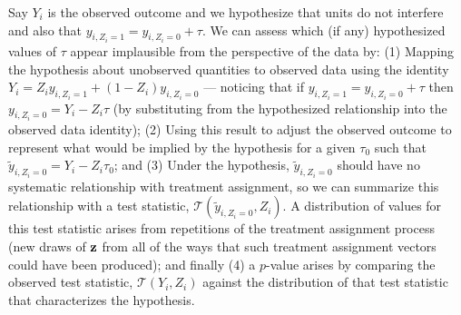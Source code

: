 Say $Y_i$ is the observed outcome and we hypothesize that units do not
interfere and also that $y_{i,Z_i=1}=y_{i,Z_i=0}+\tau$. We can assess which
(if any) hypothesized values of $\tau$ appear implausible from the perspective
of the data by: (1) Mapping the hypothesis about unobserved quantities to
observed data using the identity $Y_i=Z_i y_{i,Z_i=1} + (1-Z_i) y_{i,Z_i=0}$
--- noticing that if $y_{i,Z_i=1}=y_{i,Z_i=0}+\tau$ then $y_{i,Z_i=0}=Y_i -
Z_i \tau$ (by substituting from the hypothesized relationship into the
observed data identity); (2) Using this result to adjust the observed outcome
to represent what would be implied by the hypothesis for a given $\tau_0$ such
that $\widetilde y_{i,Z_i=0}=Y_i - Z_i \tau_0$; and (3) Under the hypothesis,
$\widetilde y_{i,Z_i=0}$ should have no systematic relationship with treatment
assignment, so we can summarize this relationship with a test statistic,
$\mathcal T(\widetilde y_{i,Z_i=0},Z_i)$. A distribution of values for this
test statistic arises from repetitions of the treatment assignment process
(new draws of $\mathbf{z}$ from all of the ways that such treatment assignment
vectors could have been produced); and finally (4) a $p$-value arises by
comparing the observed test statistic, $\mathcal T(Y_i,Z_i)$ against the
distribution of that test statistic that characterizes the hypothesis.

